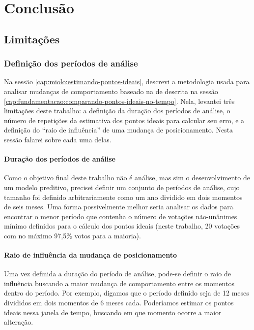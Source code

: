 \chapter{Conclusão}\label{cap:conclusao}

\section{Limitações}
\label{cap:conclusao:limitacoes}

\subsection{Definição dos períodos de análise}

Na sessão \ref{cap:miolo:estimando-pontos-ideais}, descrevi a metodologia usada
para analisar mudanças de comportamento baseado na de 
descrita na sessão \ref{cap:fundamentacao:comparando-pontos-ideais-no-tempo}.
Nela, levantei três limitações deste trabalho: a definição da duração dos
períodos de análise, o número de repetições da estimativa dos pontos ideais para
calcular seu erro, e a definição do ``raio de influência'' de uma mudança de
posicionamento. Nesta sessão falarei sobre cada uma delas.

\subsubsection*{Duração dos períodos de análise}

Como o objetivo final deste trabalho não é análise, mas sim o desenvolvimento
de um modelo preditivo, precisei definir um conjunto de períodos de análise,
cujo tamanho foi definido arbitrariamente como um ano dividido em dois momentos
de seis meses. Uma forma possivelmente melhor seria analisar os dados para
encontrar o menor período que contenha o número de votações não-unânimes mínimo
definidos para o cálculo dos pontos ideais (neste trabalho, 20 votações com no
máximo 97,5\% votos para a maioria).

\subsubsection*{Raio de influência da mudança de posicionamento}

Uma vez definida a duração do período de análise, pode-se definir o raio de
influência buscando a maior mudança de comportamento entre os momentos dentro
do período. Por exemplo, digamos que o período definido seja de 12 meses
divididos em dois momentos de 6 meses cada. Poderíamos estimar os pontos ideais
nessa janela de tempo, buscando em que momento ocorre a maior alteração.

